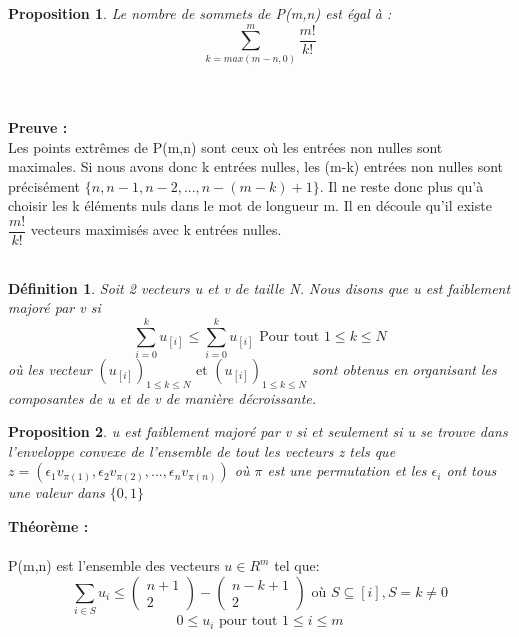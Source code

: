 \documentclass{book}
\newtheorem{petit_nom1}{Proposition}
\newtheorem{petit_nom2}{Définition}[chapter]
\begin{document}
\begin{petit_nom1}
Le nombre de sommets de P(m,n) est égal à :
\begin{equation}
\sum_{k=max(m-n,0)}^m \dfrac{m!}{k!} 
\end{equation}
\end{petit_nom1}\\\\
\textbf{Preuve : }\\
Les points extrêmes de P(m,n) sont ceux où les entrées non nulles sont maximales. Si nous avons donc k entrées nulles, les (m-k) entrées non nulles sont précisément $ \{n,n-1,n-2,...,n-(m-k)+1 \} $. Il ne reste donc plus qu'à choisir les k éléments nuls dans le mot de longueur m. Il en découle qu'il existe $\dfrac{m!}{k!}$ vecteurs maximisés avec k entrées nulles.\\\\
\begin{petit_nom2}
Soit 2 vecteurs u et v de taille N. Nous disons que u est faiblement majoré par v si 
\begin{equation}
\sum_{i=0}^k u_{[i]} \leqslant \sum_{i=0}^k u_{[i]}  \text{           Pour tout } 1\leqslant k  \leqslant N
\end{equation}
où les vecteur $ (u_{[i]})_{1\leqslant k  \leqslant N} \text{ et } (u_{[i]})_{1\leqslant k  \leqslant N} $ sont obtenus en organisant les composantes de u et de v de manière décroissante. 
\end{petit_nom2}
\begin{petit_nom1}
u est faiblement majoré par v si et seulement si u se trouve dans l'enveloppe convexe de l'ensemble de tout les vecteurs z tels que $z= (\epsilon_1v_{\pi(1)},\epsilon_2v_{\pi(2)},...,\epsilon_nv_{\pi(n)})$ où $\pi$ est une permutation et les $\epsilon_i$ ont tous une valeur dans $\{0,1\}$
\end{petit_nom1}
\textbf{Théorème :} \\\\
P(m,n) est l'ensemble des vecteurs $u \in R^m$ tel que:
\begin{equation}
\sum_{i \in S} u_i \leqslant \begin{pmatrix}
n+1\\2
\end{pmatrix}-\begin{pmatrix}
n-k+1\\2
\end{pmatrix}
\text{           où } S  \subseteq [i] , S=k \neq 0
\end{equation}
\begin{equation}
0 \leqslant u_i  \text{           pour tout  } 1\leqslant i\leqslant m
\end{equation}
\end{document}
